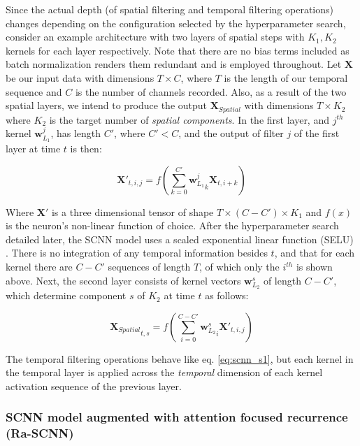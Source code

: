 \documentclass[fleqn,10pt]{wlscirep}
\begin{document}
Since the actual depth (of spatial filtering and temporal filtering operations) changes depending on the configuration selected by the hyperparameter search, consider an example architecture with two layers of spatial steps with $K_1, K_2$ kernels for each layer respectively. Note that there are no bias terms included as batch normalization \cite{Szegedy2015} renders them redundant and is employed throughout. Let $\boldsymbol{X}$ be our input data with dimensions $T \times C$, where $T$ is the length of our temporal sequence and $C$ is the number of channels recorded. Also, as a result of the two spatial layers, we intend to produce the output $\boldsymbol{X}_{Spatial}$ with dimensions $T \times K_2$ where $K_2$ is the target number of {\em spatial components}. In the first layer, and $j^{th}$ kernel $\boldsymbol{w}_{L_1}^j$, has length $C'$, where $C' < C$, and the output of filter $j$ of the first layer at time $t$ is then:

\begin{equation} \label{eq:scnn_s1}
  \boldsymbol{X'}_{t, i, j} = f\left(\sum_{k=0}^{C'} {\boldsymbol{w}_{L_1}^j}_k \boldsymbol{X}_{t,i+k}\right)
\end{equation}

Where $\boldsymbol{X'}$ is a three dimensional tensor of shape $T \times (C-C') \times K_1$ and $f(x)$ is the neuron's non-linear function of choice. After the hyperparameter search detailed later, the SCNN model uses a scaled exponential linear function (SELU) \cite{NIPS2017_6698}. There is no integration of any temporal information besides $t$, and that for each kernel there are $C-C'$ sequences of length $T$, of which only the $i^{th}$ is shown above. Next, the second layer consists of kernel vectors $\boldsymbol{w}_{L_2}^s$ of length $C-C'$, which determine component $s$ of $K_2$ at time $t$ as follows:

\begin{equation} \label{eq:scnn_s2}
  {\boldsymbol{X}_{Spatial}}_{t, s} = f\left(\sum_{i=0}^{C-C'}{\boldsymbol{w}_{L_2}^s}_i \boldsymbol{X'}_{t, i, j}\right)
\end{equation}

The temporal filtering operations behave like eq. \ref{eq:scnn_s1}, but each kernel in the temporal layer is applied across the {\em temporal} dimension of each kernel activation sequence of the previous layer.

\subsubsection*{SCNN model augmented with attention focused recurrence (Ra-SCNN)} 
\end{document}
